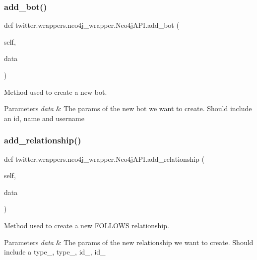 \subsubsection{\texorpdfstring{add\+\_\+bot()}{add\_bot()}}
{\footnotesize\ttfamily def twitter.\+wrappers.\+neo4j\+\_\+wrapper.\+Neo4j\+A\+P\+I.\+add\+\_\+bot (\begin{DoxyParamCaption}\item[{}]{self,  }\item[{}]{data }\end{DoxyParamCaption})}



Method used to create a new bot. 


\begin{DoxyParams}{Parameters}
{\em data} & The params of the new bot we want to create. Should include an id, name and username \\
\hline
\end{DoxyParams}
\mbox{\label{classtwitter_1_1wrappers_1_1neo4j__wrapper_1_1Neo4jAPI_a754d17ed04106caedac79a38d0b6d6e6}} 
\subsubsection{\texorpdfstring{add\+\_\+relationship()}{add\_relationship()}}
{\footnotesize\ttfamily def twitter.\+wrappers.\+neo4j\+\_\+wrapper.\+Neo4j\+A\+P\+I.\+add\+\_\+relationship (\begin{DoxyParamCaption}\item[{}]{self,  }\item[{}]{data }\end{DoxyParamCaption})}



Method used to create a new F\+O\+L\+L\+O\+WS relationship. 


\begin{DoxyParams}{Parameters}
{\em data} & The params of the new relationship we want to create. Should include a type\+\_, type\+\_, id\+\_, id\+\_ \\
\hline
\end{DoxyParams}
\mbox{\label{classtwitter_1_1wrappers_1_1neo4j__wrapper_1_1Neo4jAPI_ad165965732c986fd93cbd0dd8dd23ccc}} 
